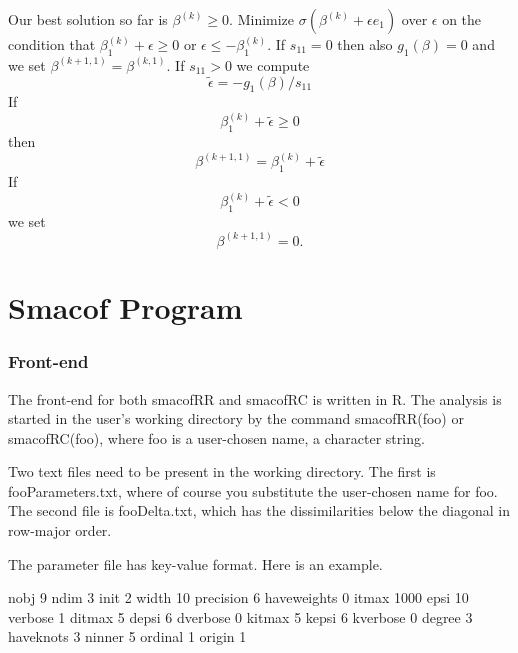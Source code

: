 \documentclass[
  12pt,
]{article}
\newenvironment{Shaded}{\begin{snugshade}}{\end{snugshade}}
\newcommand{\DecValTok}[1]{\textcolor[rgb]{0.00,0.00,0.81}{#1}}
\newcommand{\NormalTok}[1]{#1}
\begin{document}
Our best solution so far is
\(\beta^{(k)}\geq 0\). Minimize \(\sigma(\beta^{(k)}+\epsilon e_1)\) over \(\epsilon\)
on the condition that \(\beta^{(k)}_1+\epsilon\geq 0\) or \(\epsilon\leq-\beta^{(k)}_1\).
If \(s_{11}=0\) then also \(g_1(\beta)=0\) and we set \(\beta^{(k+1,1)}=\beta^{(k,1)}\).
If \(s_{11}>0\) we compute
\[
\tilde\epsilon=-g_1(\beta)/s_{11}
\]
If
\[
\beta^{(k)}_1+\tilde\epsilon\geq 0
\]
then
\[
\beta^{(k+1,1)}=\beta^{(k)}_1+\tilde\epsilon
\]
If
\[
\beta^{(k)}_1+\tilde\epsilon<0
\]
we set
\[
\beta^{(k+1,1)}=0.
\]

\section{Smacof Program}\label{smacof-program}

\subsubsection{Front-end}\label{front-end}

The front-end for both smacofRR and smacofRC is written in R. The analysis is
started in the user's working directory by the command smacofRR(foo) or smacofRC(foo),
where foo is a user-chosen name, a character string.

Two text files need to be present in the working directory. The first is fooParameters.txt,
where of course you substitute the user-chosen name for foo. The second file is
fooDelta.txt, which has the dissimilarities below the diagonal in row-major order.

The parameter file has key-value format. Here is an example.

\begin{Shaded}
\begin{Highlighting}[]
\NormalTok{nobj   }\DecValTok{9}
\NormalTok{ndim   }\DecValTok{3}
\NormalTok{init   }\DecValTok{2}
\NormalTok{width   }\DecValTok{10}
\NormalTok{precision   }\DecValTok{6}
\NormalTok{haveweights   }\DecValTok{0}
\NormalTok{itmax  }\DecValTok{1000}
\NormalTok{epsi  }\DecValTok{10}
\NormalTok{verbose  }\DecValTok{1}
\NormalTok{ditmax  }\DecValTok{5}
\NormalTok{depsi  }\DecValTok{6}
\NormalTok{dverbose  }\DecValTok{0}
\NormalTok{kitmax  }\DecValTok{5}
\NormalTok{kepsi  }\DecValTok{6}
\NormalTok{kverbose  }\DecValTok{0}
\NormalTok{degree  }\DecValTok{3}
\NormalTok{haveknots  }\DecValTok{3}
\NormalTok{ninner  }\DecValTok{5}
\NormalTok{ordinal  }\DecValTok{1}
\NormalTok{origin  }\DecValTok{1}
\end{Highlighting}
\end{Shaded}
\end{document}
